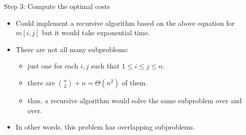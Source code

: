 \documentclass{beamer}
\begin{document}
\begin{frame}{Step 3: Compute the optimal costs}
    \begin{itemize}
        \item Could implement a recursive algorithm based on the above equation for $m[i, j]$ but it would take exponential time.
        \item There are not all many subproblems:
            \begin{itemize}
                \item just one for each $i, j$ such that $1 \leq i \leq j \leq n$.
                \item there are ${n \choose 2} + n = \Theta (n^2)$ of them.
                \item thus, a recursive algorithm would solve the same subproblem over and over.
            \end{itemize}
        \item In other words, this problem has overlapping subproblems.
    \end{itemize}
\end{frame}
\end{document}
